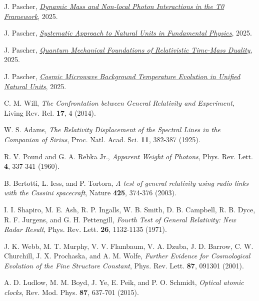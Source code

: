 \documentclass[12pt,a4paper]{article}
\begin{document}
\begin{thebibliography}{99}
		J. Pascher, \href{https://github.com/jpascher/T0-Time-Mass-Duality/blob/main/2/pdf/DynMassePhotonenNichtlokalEn.pdf}{\textit{Dynamic Mass and Non-local Photon Interactions in the T0 Framework}}, 2025.
		
		J. Pascher, \href{https://github.com/jpascher/T0-Time-Mass-Duality/blob/main/2/pdf/NatEinheitenSystematikEn.pdf}{\textit{Systematic Approach to Natural Units in Fundamental Physics}}, 2025.
		
		J. Pascher, \href{https://github.com/jpascher/T0-Time-Mass-Duality/blob/main/2/pdf/QMRelTimeMassPart1ZEn.pdf}{\textit{Quantum Mechanical Foundations of Relativistic Time-Mass Duality}}, 2025.
		
		J. Pascher, \href{https://github.com/jpascher/T0-Time-Mass-Duality/blob/main/2/pdf/TempEinheitenCMBEn.pdf}{\textit{Cosmic Microwave Background Temperature Evolution in Unified Natural Units}}, 2025.
		
		 C. M. Will, \textit{The Confrontation between General Relativity and Experiment}, Living Rev. Rel. \textbf{17}, 4 (2014).
		
		 W. S. Adams, \textit{The Relativity Displacement of the Spectral Lines in the Companion of Sirius}, Proc. Natl. Acad. Sci. \textbf{11}, 382-387 (1925).
		
		 R. V. Pound and G. A. Rebka Jr., \textit{Apparent Weight of Photons}, Phys. Rev. Lett. \textbf{4}, 337-341 (1960).
		
		 B. Bertotti, L. Iess, and P. Tortora, \textit{A test of general relativity using radio links with the Cassini spacecraft}, Nature \textbf{425}, 374-376 (2003).
		
		 I. I. Shapiro, M. E. Ash, R. P. Ingalls, W. B. Smith, D. B. Campbell, R. B. Dyce, R. F. Jurgens, and G. H. Pettengill, \textit{Fourth Test of General Relativity: New Radar Result}, Phys. Rev. Lett. \textbf{26}, 1132-1135 (1971).
		
		 J. K. Webb, M. T. Murphy, V. V. Flambaum, V. A. Dzuba, J. D. Barrow, C. W. Churchill, J. X. Prochaska, and A. M. Wolfe, \textit{Further Evidence for Cosmological Evolution of the Fine Structure Constant}, Phys. Rev. Lett. \textbf{87}, 091301 (2001).
		
		 A. D. Ludlow, M. M. Boyd, J. Ye, E. Peik, and P. O. Schmidt, \textit{Optical atomic clocks}, Rev. Mod. Phys. \textbf{87}, 637-701 (2015).
		

\end{thebibliography}
\end{document}
